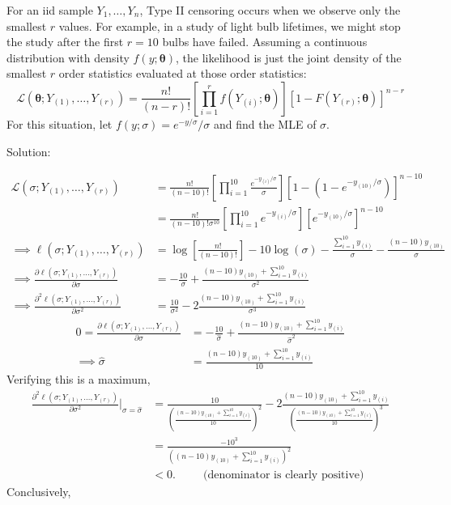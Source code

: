\documentclass[
  letterpaper,
  DIV=11,
  numbers=noendperiod]{scrreprt}
\begin{document}
For an iid sample \(Y_1,\dots, Y_n\), Type II censoring occurs when we
observe only the smallest \(r\) values. For example, in a study of light
bulb lifetimes, we might stop the study after the first \(r=10\) bulbs
have failed. Assuming a continuous distribution with density
\(f(y;\mathbf{\theta})\), the likelihood is just the joint density of
the smallest \(r\) order statistics evaluated at those order statistics:
\[\mathcal L\left(\mathbf \theta; Y_{(1)}, \dots, Y_{(r)}\right) = \frac {n!}{(n-r)!}\left[\prod_{i=1}^r f\left(Y_{(i)}; \mathbf \theta \right) \right]\left[1-F\left(Y_{(r)}; \mathbf \theta \right)\right]^{n-r}\]
For this situation, let \(f(y;\sigma) = e^{-y/\sigma}/\sigma\) and find
the MLE of \(\sigma\).

Solution:

\[ \begin{aligned}
\mathcal L\left(\sigma; Y_{(1)}, \dots, Y_{(r)}\right) &= \frac {n!}{(n-10)!}\left[\prod_{i=1}^{10} \frac {e^{-y_{(i)}/\sigma}} \sigma \right]\left[1-\left(1- e^{-y_{(10)}/\sigma}\right) \right]^{n-10} \\
&= \frac {n!}{(n-10)!\sigma^{10}}\left[\prod_{i=1}^{10} {e^{-y_{(i)}/\sigma}} \right]\left[e^{-y_{(10)}/\sigma} \right]^{n-10} \\
\implies \ell \left(\sigma; Y_{(1)}, \dots, Y_{(r)}\right) &= \log \left[\frac {n!}{(n-10)!} \right] - 10 \log(\sigma) -  \frac{\sum_{i=1}^{10}y_{(i)}} {\sigma} - \frac{(n-10)y_{(10)}}{\sigma}\\
\implies \frac {\partial \ell \left(\sigma; Y_{(1)}, \dots, Y_{(r)}\right)}{\partial \sigma} &= - \frac{10}{\sigma} +  \frac{(n-10)y_{(10)}+ \sum_{i=1}^{10}y_{(i)}} {\sigma^2} \\
\implies \frac {\partial^2 \ell \left(\sigma; Y_{(1)}, \dots, Y_{(r)}\right)}{\partial \sigma^2} &= \frac{10}{\sigma^2} -  2\frac{(n-10)y_{(10)}+ \sum_{i=1}^{10}y_{(i)}} {\sigma^3}
\end{aligned}\] \[ \begin{aligned}
0= \frac {\partial \ell \left(\sigma; Y_{(1)}, \dots, Y_{(r)}\right)}{\partial {\sigma}} &= - \frac{10}{\hat{\sigma}} +  \frac{(n-10)y_{(10)}+ \sum_{i=1}^{10}y_{(i)}} {\hat{\sigma}^2} \\
\implies  \hat{\sigma} &= \frac{(n-10)y_{(10)}+ \sum_{i=1}^{10}y_{(i)}}{10}
\end{aligned}
\] Verifying this is a maximum, \[\begin{aligned}
\frac {\partial^2 \ell \left(\sigma; Y_{(1)}, \dots, Y_{(r)}\right)}{\partial \sigma^2} \bigg|_{\sigma = \hat \sigma}&= \frac{10}{\left(\frac{(n-10)y_{(10)}+ \sum_{i=1}^{10}y_{(i)}}{10}\right)^2} - 2 \frac{(n-10)y_{(10)}+ \sum_{i=1}^{10}y_{(i)}} {\left( \frac{(n-10)y_{(10)}+ \sum_{i=1}^{10}y_{(i)}}{10} \right)^3} \\
&=  \frac{-10^3}{\left({(n-10)y_{(10)}+ \sum_{i=1}^{10}y_{(i)}}\right)^2}\\
&< 0. ~~~~~~~~~~~\text{(denominator is clearly positive)}
\end{aligned}\] Conclusively,
\end{document}
